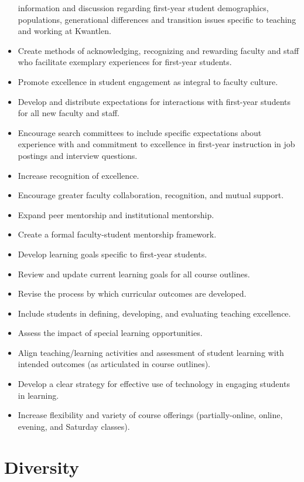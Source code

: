 \documentclass[11pt, letterpaper]{article}
\begin{document}
\begin{itemize}
  information and discussion regarding first-year student demographics,
  populations, generational differences and transition issues specific
  to teaching and working at Kwantlen.
\item
  Create methods of acknowledging, recognizing and rewarding faculty and
  staff who facilitate exemplary experiences for first-year students.
\item
  Promote excellence in student engagement as integral to faculty
  culture.
\item
  Develop and distribute expectations for interactions with first-year
  students for all new faculty and staff.
\item
  Encourage search committees to include specific expectations about
  experience with and commitment to excellence in first-year instruction
  in job postings and interview questions.
\item
  Increase recognition of excellence.
\item
  Encourage greater faculty collaboration, recognition, and mutual
  support.
\item
  Expand peer mentorship and institutional mentorship.
\item
  Create a formal faculty-student mentorship framework.
\item
  Develop learning goals specific to first-year students.
\item
  Review and update current learning goals for all course outlines.
\item
  Revise the process by which curricular outcomes are developed.
\item
  Include students in defining, developing, and evaluating teaching
  excellence.
\item
  Assess the impact of special learning opportunities.
\item
  Align teaching/learning activities and assessment of student learning
  with intended outcomes (as articulated in course outlines).
\item
  Develop a clear strategy for effective use of technology in engaging
  students in learning.
\item
  Increase flexibility and variety of course offerings
  (partially-online, online, evening, and Saturday classes).
\end{itemize}

\newpage
\section{Diversity}
\end{document}
